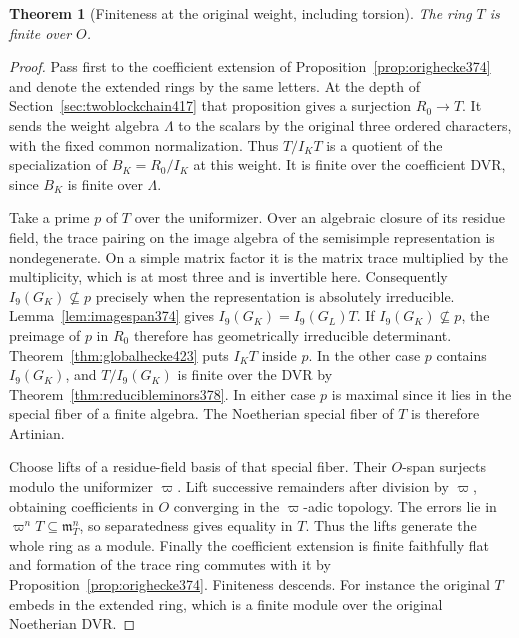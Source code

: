 \documentclass[a4paper,11pt]{article}
\newtheorem{theorem}[proposition]{Theorem}
\theoremstyle{definition}
\theoremstyle{remark}
\numberwithin{equation}{section}
\begin{document}
\begin{theorem}[Finiteness at the original weight, including torsion]\leavevmode
\label{thm:originalfinite424}
The ring \(T\) is finite over \(O\).
\end{theorem}
\begin{proof}
Pass first to the coefficient extension of Proposition~\ref{prop:orighecke374}
and denote the extended rings by the same letters. At the depth
of Section~\ref{sec:twoblockchain417} that proposition gives a
surjection \(R_0\to T\). It sends the weight algebra \(\Lambda\)
to the scalars by the original three ordered characters, with
the fixed common normalization. Thus \(T/I_K T\) is a quotient
of the specialization of \(B_K=R_0/I_K\) at this weight.
It is finite over the coefficient DVR, since \(B_K\) is finite
over \(\Lambda\).

Take a prime \(p\) of \(T\) over the uniformizer. Over an
algebraic closure of its residue field, the trace pairing on
the image algebra of the semisimple representation is
nondegenerate. On a simple matrix factor it is the matrix
trace multiplied by the multiplicity, which is at most three
and is invertible here. Consequently \(I_9(G_K)\not\subseteq p\)
precisely when the representation is absolutely irreducible.
Lemma~\ref{lem:imagespan374} gives
\(I_9(G_K)=I_9(G_L)T\). If \(I_9(G_K)\not\subseteq p\), the
preimage of \(p\) in \(R_0\) therefore has geometrically
irreducible determinant. Theorem~\ref{thm:globalhecke423} puts
\(I_K T\) inside \(p\). In the other case \(p\) contains
\(I_9(G_K)\), and \(T/I_9(G_K)\) is finite over the DVR by
Theorem~\ref{thm:reducibleminors378}. In either case \(p\)
is maximal since it lies in the special fiber of a finite
algebra. The Noetherian special fiber of \(T\) is therefore
Artinian.

Choose lifts of a residue-field basis of that special fiber.
Their \(O\)-span surjects modulo the uniformizer \(\varpi\).
Lift successive remainders after division by \(\varpi\), obtaining
coefficients in \(O\) converging in the \(\varpi\)-adic topology.
The errors lie in \(\varpi^n T\subseteq\mathfrak m_T^n\),
so separatedness gives equality in \(T\). Thus the lifts generate
the whole ring as a module. Finally the coefficient extension is
finite faithfully flat and formation of the trace ring commutes
with it by Proposition~\ref{prop:orighecke374}. Finiteness
descends. For instance the original \(T\) embeds in the extended
ring, which is a finite module over the original Noetherian DVR.
\end{proof}
\end{document}

